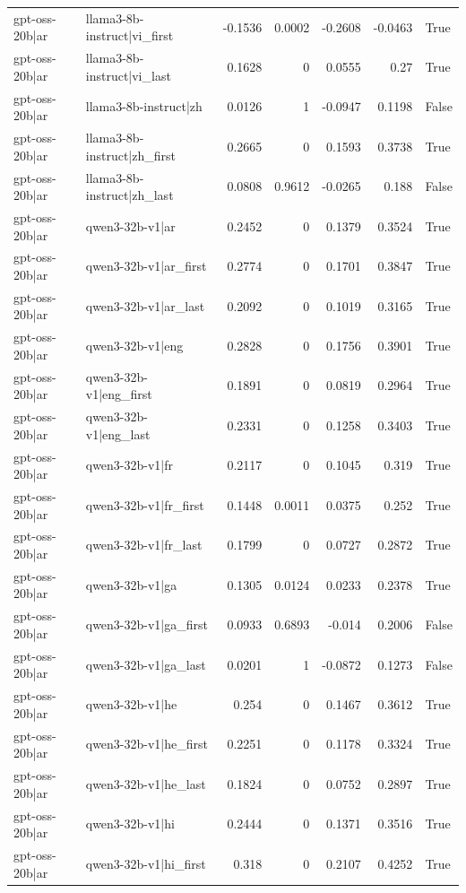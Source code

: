 \begin{table}
\begin{tabular}{l l r r r r l}
gpt-oss-20b|ar & llama3-8b-instruct|vi_first & -0.1536 & 0.0002 & -0.2608 & -0.0463 & True \\
gpt-oss-20b|ar & llama3-8b-instruct|vi_last & 0.1628 & 0 & 0.0555 & 0.27 & True \\
gpt-oss-20b|ar & llama3-8b-instruct|zh & 0.0126 & 1 & -0.0947 & 0.1198 & False \\
gpt-oss-20b|ar & llama3-8b-instruct|zh_first & 0.2665 & 0 & 0.1593 & 0.3738 & True \\
gpt-oss-20b|ar & llama3-8b-instruct|zh_last & 0.0808 & 0.9612 & -0.0265 & 0.188 & False \\
gpt-oss-20b|ar & qwen3-32b-v1|ar & 0.2452 & 0 & 0.1379 & 0.3524 & True \\
gpt-oss-20b|ar & qwen3-32b-v1|ar_first & 0.2774 & 0 & 0.1701 & 0.3847 & True \\
gpt-oss-20b|ar & qwen3-32b-v1|ar_last & 0.2092 & 0 & 0.1019 & 0.3165 & True \\
gpt-oss-20b|ar & qwen3-32b-v1|eng & 0.2828 & 0 & 0.1756 & 0.3901 & True \\
gpt-oss-20b|ar & qwen3-32b-v1|eng_first & 0.1891 & 0 & 0.0819 & 0.2964 & True \\
gpt-oss-20b|ar & qwen3-32b-v1|eng_last & 0.2331 & 0 & 0.1258 & 0.3403 & True \\
gpt-oss-20b|ar & qwen3-32b-v1|fr & 0.2117 & 0 & 0.1045 & 0.319 & True \\
gpt-oss-20b|ar & qwen3-32b-v1|fr_first & 0.1448 & 0.0011 & 0.0375 & 0.252 & True \\
gpt-oss-20b|ar & qwen3-32b-v1|fr_last & 0.1799 & 0 & 0.0727 & 0.2872 & True \\
gpt-oss-20b|ar & qwen3-32b-v1|ga & 0.1305 & 0.0124 & 0.0233 & 0.2378 & True \\
gpt-oss-20b|ar & qwen3-32b-v1|ga_first & 0.0933 & 0.6893 & -0.014 & 0.2006 & False \\
gpt-oss-20b|ar & qwen3-32b-v1|ga_last & 0.0201 & 1 & -0.0872 & 0.1273 & False \\
gpt-oss-20b|ar & qwen3-32b-v1|he & 0.254 & 0 & 0.1467 & 0.3612 & True \\
gpt-oss-20b|ar & qwen3-32b-v1|he_first & 0.2251 & 0 & 0.1178 & 0.3324 & True \\
gpt-oss-20b|ar & qwen3-32b-v1|he_last & 0.1824 & 0 & 0.0752 & 0.2897 & True \\
gpt-oss-20b|ar & qwen3-32b-v1|hi & 0.2444 & 0 & 0.1371 & 0.3516 & True \\
gpt-oss-20b|ar & qwen3-32b-v1|hi_first & 0.318 & 0 & 0.2107 & 0.4252 & True \\

\end{tabular}
\end{table}
